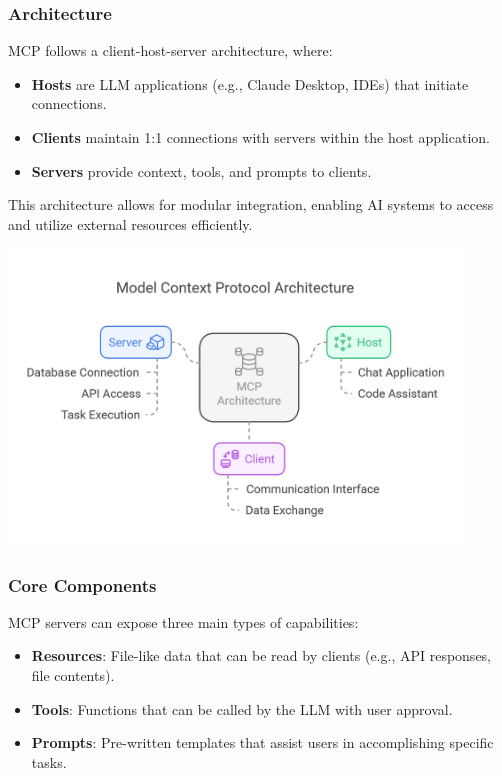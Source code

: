 \subsubsection{Architecture}
MCP follows a client-host-server architecture, where:

\begin{itemize}
    \item \textbf{Hosts} are LLM applications (e.g., Claude Desktop, IDEs) that initiate connections.
    \item \textbf{Clients} maintain 1:1 connections with servers within the host application.
    \item \textbf{Servers} provide context, tools, and prompts to clients.
\end{itemize}

This architecture allows for modular integration, enabling AI systems to access and utilize external resources efficiently.

\begin{center}
    \includegraphics[width=0.9\textwidth]{Images/mcp_architecture_diagram.png}
     \cite{mcpArchitecture}
    \label{fig:mcp_architecture}
\end{center}

\subsubsection{Core Components}
MCP servers can expose three main types of capabilities:

\begin{itemize}
    \item \textbf{Resources}: File-like data that can be read by clients (e.g., API responses, file contents).
    \item \textbf{Tools}: Functions that can be called by the LLM with user approval.
    \item \textbf{Prompts}: Pre-written templates that assist users in accomplishing specific tasks.
\end{itemize}

